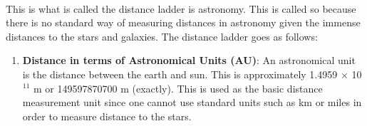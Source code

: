 \documentclass[a4paper,twoside]{article}
\numberwithin{equation}{section}
\begin{document}
\paragraph{}
This is what is called the distance ladder is astronomy. This is called so because there is no standard way of measuring distances in astronomy given the immense distances to the stars and galaxies. The distance ladder goes as follows:
\begin{enumerate}
    \item \textbf{Distance in terms of Astronomical Units (AU)}: An astronomical unit is the distance between the earth and sun. This is approximately 1.4959 $\times$ 10$^{11}$ m or 149597870700 m (exactly). This is used as the basic distance measurement unit since one cannot use standard units such as km or miles in order to measure distance to the stars. 
\end{enumerate}
\end{document}
